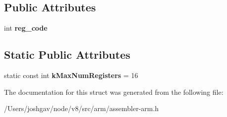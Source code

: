 \subsection*{Public Attributes}
\begin{DoxyCompactItemize}
\item 
int {\bfseries reg\+\_\+code}\hypertarget{structv8_1_1internal_1_1_qw_neon_register_a9b00c279fb743128d9a0c1d35fc34f9d}{}\label{structv8_1_1internal_1_1_qw_neon_register_a9b00c279fb743128d9a0c1d35fc34f9d}

\end{DoxyCompactItemize}
\subsection*{Static Public Attributes}
\begin{DoxyCompactItemize}
\item 
static const int {\bfseries k\+Max\+Num\+Registers} = 16\hypertarget{structv8_1_1internal_1_1_qw_neon_register_a959f839f58208afd2f3f5779be6eff06}{}\label{structv8_1_1internal_1_1_qw_neon_register_a959f839f58208afd2f3f5779be6eff06}

\end{DoxyCompactItemize}


The documentation for this struct was generated from the following file\+:\begin{DoxyCompactItemize}
\item 
/\+Users/joshgav/node/v8/src/arm/assembler-\/arm.\+h\end{DoxyCompactItemize}
